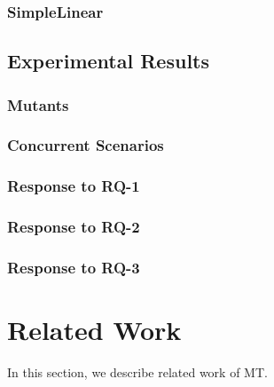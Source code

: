 \documentclass[conference]{IEEEtran}
\theoremstyle{remark}
\begin{document}
\subsubsection{SimpleLinear}
\label{sec:simpleLinear}





\subsection{Experimental Results}

\subsubsection{Mutants}
\label{section:mutants}


\subsubsection{Concurrent Scenarios}
\subsubsection{Response to RQ-1}
\subsubsection{Response to RQ-2}
\subsubsection{Response to RQ-3}

\section{Related Work}
\label{section:related}
In this section, we describe related work of MT.
\end{document}
